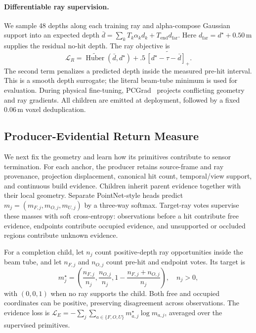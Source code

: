 \paragraph{Differentiable ray supervision.}
We sample 48 depths along each training ray and alpha-compose Gaussian support into an expected depth
$\bar d=\sum_k T_k\alpha_k d_k+T_{\mathrm{end}}d_{\mathrm{far}}$.
Here $d_{\mathrm{far}}=d^\star+0.50$\,m supplies the residual no-hit depth.
The ray objective is
\begin{equation}
\mathcal L_R=
\widetilde{\operatorname{Huber}}(\bar d,d^\star)
+.5\,\widetilde{[d^\star-\tau-\bar d]_+}.
\label{eq:smooth-ray-loss}
\end{equation}
The second term penalizes a predicted depth inside the measured pre-hit interval. This is a smooth
depth surrogate; the literal beam-tube minimum is used for evaluation.
During physical fine-tuning, PCGrad~\cite{yu2020pcgrad} projects conflicting geometry and ray gradients.
All children are emitted at deployment, followed by a fixed $0.06$\,m voxel deduplication.

\subsection{Producer-Evidential Return Measure}

We next fix the geometry and learn how its primitives contribute to sensor termination.
For each anchor, the producer retains source-frame and ray provenance, projection displacement,
canonical hit count, temporal/view support, and continuous build evidence.
Children inherit parent evidence together with their local geometry.
Separate PointNet-style heads predict
$m_j=(m_{F,j},m_{O,j},m_{U,j})$ by a three-way softmax.
Target-ray votes supervise these masses with soft cross-entropy: observations before a hit contribute
free evidence, endpoints contribute occupied evidence, and unsupported or occluded regions contribute unknown evidence.

For a completion child, let $n_j$ count positive-depth ray opportunities inside the beam tube,
and let $n_{F,j}$ and $n_{O,j}$ count pre-hit and endpoint votes. Its target is
\begin{equation}
m_j^\star=\left(\frac{n_{F,j}}{n_j},\frac{n_{O,j}}{n_j},
1-\frac{n_{F,j}+n_{O,j}}{n_j}\right),\quad n_j>0,
\label{eq:child-votes}
\end{equation}
with $(0,0,1)$ when no ray supports the child. Both free and occupied coordinates can be positive,
preserving disagreement across observations. The evidence loss is
$\mathcal L_E=-\sum_j\sum_{a\in\{F,O,U\}}m_{a,j}^\star\log m_{a,j}$,
averaged over the supervised primitives.

